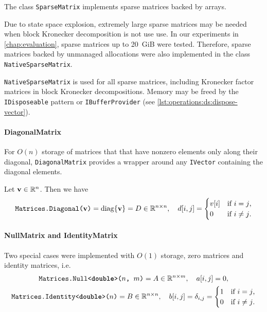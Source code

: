 The class \texttt{SparseMatrix} implements  sparse
matrices backed by  arrays.

Due to state space explosion, extremely large sparse matrices may be
needed when block Kronecker decomposition is not use use. In our
experiments in \cref{chap:evaluation}, sparse matrices up to 20~GiB
were tested. Therefore, sparse matrices backed by unmanaged
allocations were also implemented in the class
\texttt{NativeSparseMatrix}.

\texttt{NativeSparseMatrix} is used for all sparse matrices, including
Kronecker factor matrices in block Kronecker decompositions. Memory
may be freed by the \texttt{IDisposeable} pattern or
\texttt{IBufferProvider} (see
\vref{lst:operations:ds:dispose-vector}).

\paragraph{DiagonalMatrix}

For $O(n)$ storage of matrices that that have nonzero elements only
along their diagonal, \texttt{DiagonalMatrix} provides a wrapper
around any \texttt{IVector} containing the diagonal
elements.

Let $\bm{\mathrm{v}} \in \mathbb{R}^n$. Then we have
\begin{equation}
  \texttt{Matrices.Diagonal($\bm{\mathrm{v}}$)} = \operatorname{diag} \{ \bm{\mathrm{v}} \} = D \in
  \mathbb{R}^{n \times n}, \quad d[i, j] = \begin{cases}
    v[i] & \text{if $i = j$,} \\
    0 & \text{if $i \ne j$.}
  \end{cases}
\end{equation}

\paragraph{NullMatrix and IdentityMatrix}

Two special cases were implemented with $O(1)$ storage, zero matrices
and identity matrices, i.e.
\begin{gather}
  \texttt{Matrices.Null<\textbf{double}>($n$, $m$)} = A \in \mathbb{R}^{n
    \times m}, \quad a[i, j] = 0, \\
  \texttt{Matrices.Identity<\textbf{double}>($n$)}
  = B \in \mathbb{R}^{n \times n}, \quad b[i, j] = \delta_{i, j} =
  \begin{cases}
    1 & \text{if $i = j$,} \\
    0 & \text{if $i \ne j$.}
  \end{cases}  
\end{gather}

